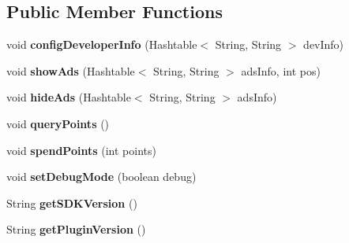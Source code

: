 \subsection*{Public Member Functions}
\begin{DoxyCompactItemize}
\item 
\mbox{\label{interfaceorg_1_1cocos2dx_1_1plugin_1_1InterfaceAds_af436b3086b86f01db28e18672f0169e0}} 
void {\bfseries config\+Developer\+Info} (Hashtable$<$ String, String $>$ dev\+Info)
\item 
\mbox{\label{interfaceorg_1_1cocos2dx_1_1plugin_1_1InterfaceAds_a07e84d42a879592250938e7cc21cadb2}} 
void {\bfseries show\+Ads} (Hashtable$<$ String, String $>$ ads\+Info, int pos)
\item 
\mbox{\label{interfaceorg_1_1cocos2dx_1_1plugin_1_1InterfaceAds_adfcaa5216bdc8b6e6cf9387db8c9fe5c}} 
void {\bfseries hide\+Ads} (Hashtable$<$ String, String $>$ ads\+Info)
\item 
\mbox{\label{interfaceorg_1_1cocos2dx_1_1plugin_1_1InterfaceAds_a2269d7f681d199017eda184fe4e08275}} 
void {\bfseries query\+Points} ()
\item 
\mbox{\label{interfaceorg_1_1cocos2dx_1_1plugin_1_1InterfaceAds_a13222ce54aa1b242058a9ece5dd78e66}} 
void {\bfseries spend\+Points} (int points)
\item 
\mbox{\label{interfaceorg_1_1cocos2dx_1_1plugin_1_1InterfaceAds_adee63fd58d7f9b5631a874730ca1b4bb}} 
void {\bfseries set\+Debug\+Mode} (boolean debug)
\item 
\mbox{\label{interfaceorg_1_1cocos2dx_1_1plugin_1_1InterfaceAds_a7f5ddd6413028fc89319315816397e21}} 
String {\bfseries get\+S\+D\+K\+Version} ()
\item 
\mbox{\label{interfaceorg_1_1cocos2dx_1_1plugin_1_1InterfaceAds_a357661b9d211535912f81843c72b2f58}} 
String {\bfseries get\+Plugin\+Version} ()
\end{DoxyCompactItemize}
